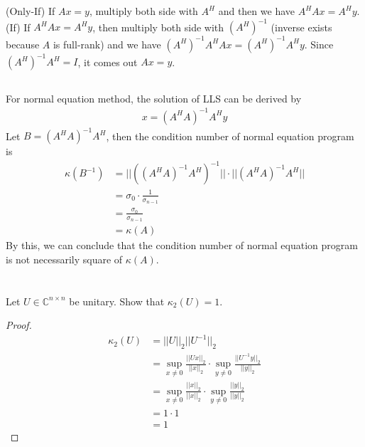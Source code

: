 \documentclass[11pt,a4paper]{article}
\begin{document}
\newpage
\section{}
\subsection{}
(Only-If) If $Ax = y$, multiply both side with $A^H$ and then we have $A^H A x
= A^H y$. \\
(If) If $A^H A x = A^H y$, then multiply both side with $(A^{H})^{-1}$
(inverse exists because $A$ is full-rank) and we have $(A^{H})^{-1} A^H Ax =
(A^{H})^{-1} A^H y$. Since $(A^{H})^{-1} A^H = I$, it comes out $Ax = y$.

\subsection{}
For normal equation method, the solution of LLS can be derived by
\begin{align}
    x = (A^H A)^{-1} A^H y
\end{align}
Let $B = (A^H A)^{-1} A^H$, then the condition number of normal equation
program is
\begin{align}
    \kappa(B^{-1}) &= || ((A^H A)^{-1} A^H)^{-1}|| \cdot || (A^H A)^{-1} A^H
    || \\
    &= \sigma_0 \cdot \frac{1}{\sigma_{n-1}} \\
    &= \frac{\sigma_0}{\sigma_{n-1}} \\
    &= \kappa(A)
\end{align}
By this, we can conclude that the condition number of normal equation program
is not necessarily square of $\kappa(A)$.

\section{}

Let $U \in \mathbb{C}^{n\times n}$ be unitary. Show that $\kappa_2(U) = 1$.
\begin{proof}
    \begin{align}
        \kappa_2 (U) &= || U ||_2 || U^{-1} ||_2  \\
        & = \sup_{x\not = 0} \frac{|| U x ||_2}{|| x ||_2} \cdot
        \sup_{y\not = 0} \frac{|| U^{-1} y ||_2}{|| y ||_2} \\
        & = \sup_{x\not = 0} \frac{|| x ||_2}{|| x ||_2} \cdot
        \sup_{y\not = 0} \frac{|| y ||_2}{|| y ||_2} \\
        & = 1 \cdot 1 \\
        & = 1
    \end{align}
\end{proof}
\end{document}
